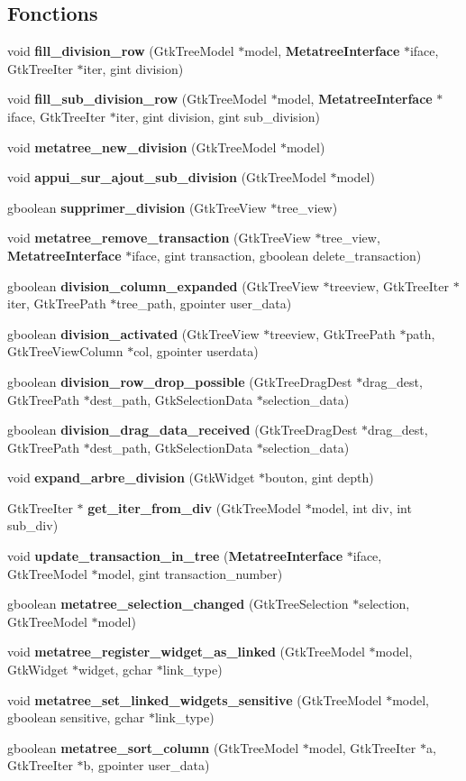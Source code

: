 \subsection*{Fonctions}
\begin{DoxyCompactItemize}
\item 
void {\bf fill\_\-division\_\-row} (GtkTreeModel $\ast$model, {\bf MetatreeInterface} $\ast$iface, GtkTreeIter $\ast$iter, gint division)
\item 
void {\bf fill\_\-sub\_\-division\_\-row} (GtkTreeModel $\ast$model, {\bf MetatreeInterface} $\ast$iface, GtkTreeIter $\ast$iter, gint division, gint sub\_\-division)
\item 
void {\bf metatree\_\-new\_\-division} (GtkTreeModel $\ast$model)
\item 
void {\bf appui\_\-sur\_\-ajout\_\-sub\_\-division} (GtkTreeModel $\ast$model)
\item 
gboolean {\bf supprimer\_\-division} (GtkTreeView $\ast$tree\_\-view)
\item 
void {\bf metatree\_\-remove\_\-transaction} (GtkTreeView $\ast$tree\_\-view, {\bf MetatreeInterface} $\ast$iface, gint transaction, gboolean delete\_\-transaction)
\item 
gboolean {\bf division\_\-column\_\-expanded} (GtkTreeView $\ast$treeview, GtkTreeIter $\ast$iter, GtkTreePath $\ast$tree\_\-path, gpointer user\_\-data)
\item 
gboolean {\bf division\_\-activated} (GtkTreeView $\ast$treeview, GtkTreePath $\ast$path, GtkTreeViewColumn $\ast$col, gpointer userdata)
\item 
gboolean {\bf division\_\-row\_\-drop\_\-possible} (GtkTreeDragDest $\ast$drag\_\-dest, GtkTreePath $\ast$dest\_\-path, GtkSelectionData $\ast$selection\_\-data)
\item 
gboolean {\bf division\_\-drag\_\-data\_\-received} (GtkTreeDragDest $\ast$drag\_\-dest, GtkTreePath $\ast$dest\_\-path, GtkSelectionData $\ast$selection\_\-data)
\item 
void {\bf expand\_\-arbre\_\-division} (GtkWidget $\ast$bouton, gint depth)
\item 
GtkTreeIter $\ast$ {\bf get\_\-iter\_\-from\_\-div} (GtkTreeModel $\ast$model, int div, int sub\_\-div)
\item 
void {\bf update\_\-transaction\_\-in\_\-tree} ({\bf MetatreeInterface} $\ast$iface, GtkTreeModel $\ast$model, gint transaction\_\-number)
\item 
gboolean {\bf metatree\_\-selection\_\-changed} (GtkTreeSelection $\ast$selection, GtkTreeModel $\ast$model)
\item 
void {\bf metatree\_\-register\_\-widget\_\-as\_\-linked} (GtkTreeModel $\ast$model, GtkWidget $\ast$widget, gchar $\ast$link\_\-type)
\item 
void {\bf metatree\_\-set\_\-linked\_\-widgets\_\-sensitive} (GtkTreeModel $\ast$model, gboolean sensitive, gchar $\ast$link\_\-type)
\item 
gboolean {\bf metatree\_\-sort\_\-column} (GtkTreeModel $\ast$model, GtkTreeIter $\ast$a, GtkTreeIter $\ast$b, gpointer user\_\-data)
\end{DoxyCompactItemize}
